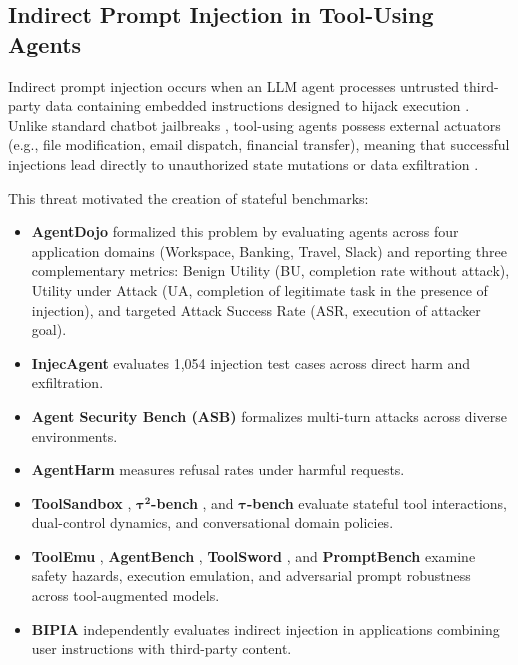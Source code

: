 \subsection{Indirect Prompt Injection in Tool-Using Agents}

Indirect prompt injection occurs when an LLM agent processes untrusted third-party data containing embedded instructions designed to hijack execution \cite{greshake2023indirect,liu2024formalizing,toyer2024tensortrust}. Unlike standard chatbot jailbreaks \cite{piet2024jailbreak,zou2023universal}, tool-using agents possess external actuators (e.g., file modification, email dispatch, financial transfer), meaning that successful injections lead directly to unauthorized state mutations or data exfiltration \cite{zhan2024injecagent,debenedetti2024agentdojo,xiang2024badchain}.

This threat motivated the creation of stateful benchmarks:
\begin{itemize}
    \item \textbf{AgentDojo} \cite{debenedetti2024agentdojo} formalized this problem by evaluating agents across four application domains (Workspace, Banking, Travel, Slack) and reporting three complementary metrics: Benign Utility (BU, completion rate without attack), Utility under Attack (UA, completion of legitimate task in the presence of injection), and targeted Attack Success Rate (ASR, execution of attacker goal).
    \item \textbf{InjecAgent} \cite{zhan2024injecagent} evaluates 1,054 injection test cases across direct harm and exfiltration.
    \item \textbf{Agent Security Bench (ASB)} \cite{zhang2025asb} formalizes multi-turn attacks across diverse environments.
    \item \textbf{AgentHarm} \cite{andriushchenko2025agentharm} measures refusal rates under harmful requests.
    \item \textbf{ToolSandbox} \cite{lu2024toolsandbox}, $\boldsymbol{\tau^2}$\textbf{-bench} \cite{barres2025tau2}, and $\boldsymbol{\tau}$\textbf{-bench} \cite{yao2024taubench} evaluate stateful tool interactions, dual-control dynamics, and conversational domain policies.
    \item \textbf{ToolEmu} \cite{ruan2024toolemu}, \textbf{AgentBench} \cite{liu2024agentbench}, \textbf{ToolSword} \cite{ye2024toolsword}, and \textbf{PromptBench} \cite{zhu2024promptbench} examine safety hazards, execution emulation, and adversarial prompt robustness across tool-augmented models.
    \item \textbf{BIPIA} \cite{yi2025bipia} independently evaluates indirect injection in applications combining user instructions with third-party content.
\end{itemize}

